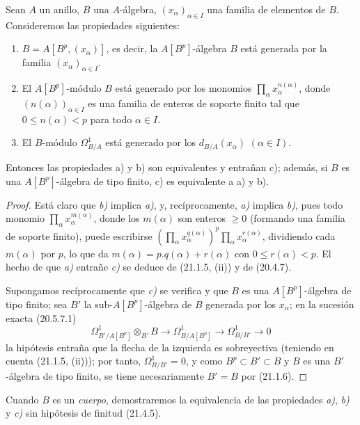 \begin{proposition}[21.1.7]
\label{0.21.1.7-fr}
Sean $A$ un anillo, $B$ una $A$-álgebra, $(x_\alpha)_{\alpha\in I}$ una
familia de elementos de $B$. Consideremos las propiedades siguientes:
\begin{enumerate}
  \item[\textup{a)}] $B=A[B^p,(x_\alpha)]$, es decir, la $A[B^p]$-álgebra $B$ está
  generada por la familia $(x_\alpha)_{\alpha\in I}$.
  \item[\textup{b)}] El $A[B^p]$-módulo $B$ está generado por los monomios
  $\prod_\alpha x_\alpha^{n(\alpha)}$, donde $(n(\alpha))_{\alpha\in I}$ es
  una familia de enteros de soporte finito tal que $0\leq n(\alpha)<p$ para
  todo $\alpha\in I$.
  \item[\textup{c)}] El $B$-módulo $\Omega^1_{B/A}$ está generado por los
  $d_{B/A}(x_\alpha)$ $(\alpha\in I)$.
\end{enumerate}
Entonces las propiedades \textup{a)} y \textup{b)} son equivalentes y entrañan \textup{c)}; además, si
$B$ es una $A[B^p]$-álgebra de tipo finito, \textup{c)} es equivalente a \textup{a)} y \textup{b)}.
\end{proposition}

\begin{proof}
Está claro que \emph{b)} implica \emph{a)}, y, recíprocamente, \emph{a)} implica \emph{b)}, pues todo
monomio $\prod_\alpha x_\alpha^{m(\alpha)}$, donde los $m(\alpha)$ son
enteros $\geq0$ (formando una familia de soporte finito), puede escribirse
$(\prod_\alpha x_\alpha^{q(\alpha)})^p\prod_\alpha x_\alpha^{r(\alpha)}$,
dividiendo cada $m(\alpha)$ por $p$, lo que da
$m(\alpha)=p.q(\alpha)+r(\alpha)$ con $0\leq r(\alpha)<p$.
El hecho de que \emph{a)} entrañe \emph{c)} se deduce de (21.1.5, (ii)) y de (20.4.7).

Supongamos recíprocamente que \emph{c)} se verifica y que $B$ es una
$A[B^p]$-álgebra de tipo finito; sea $B'$ la sub-$A[B^p]$-álgebra de $B$
generada por los $x_\alpha$; en la sucesión exacta (20.5.7.1)
\[
\Omega^1_{B'/A[B^p]}\otimes_{B'}B\longrightarrow
\Omega^1_{B/A[B^p]}\longrightarrow\Omega^1_{B/B'}\longrightarrow0
\]
la hipótesis entraña que la flecha de la izquierda es sobreyectiva (teniendo
en cuenta (21.1.5, (ii))); por tanto, $\Omega^1_{B/B'}=0$, y como
$B^p\subset B'\subset B$ y $B$ es una $B'$-álgebra de tipo finito, se tiene
necesariamente $B'=B$ por (21.1.6).
\end{proof}

\begin{remark}[21.1.8]
\label{0.21.1.8-fr}
Cuando $B$ es un \emph{cuerpo}, demostraremos la equivalencia de las propiedades \emph{a)},
\emph{b)} y \emph{c)} sin hipótesis de finitud (21.4.5).
\end{remark}


